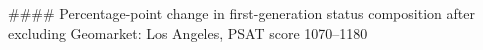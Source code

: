 #### Percentage-point change in first-generation status composition after excluding Geomarket: Los Angeles, PSAT score 1070–1180
